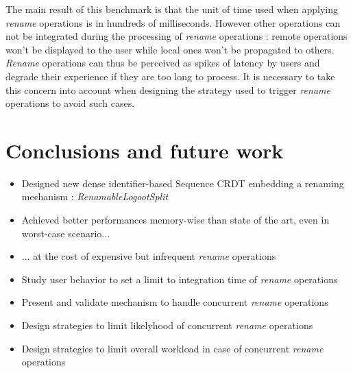\documentclass[sigplan,10pt]{acmart}
\begin{document}
The main result of this benchmark is that the unit of time used when applying \emph{rename} operations is in hundreds of milliseconds.
However other operations can not be integrated during the processing of \emph{rename} operations : remote operations won't be displayed to the user while local ones won't be propagated to others.
\emph{Rename} operations can thus be perceived as spikes of latency by users and degrade their experience if they are too long to process.
It is necessary to take this concern into account when designing the strategy used to trigger \emph{rename} operations to avoid such cases.

\section{Conclusions and future work}

\begin{itemize}
    \item Designed new dense identifier-based Sequence CRDT embedding a renaming mechanism : \emph{RenamableLogootSplit}
    \item Achieved better performances memory-wise than state of the art, even in worst-case scenario...
    \item ... at the cost of expensive but infrequent \emph{rename} operations
    \item Study user behavior to set a limit to integration time of \emph{rename} operations
    \item Present and validate mechanism to handle concurrent \emph{rename} operations
    \item Design strategies to limit likelyhood of concurrent \emph{rename} operations
    \item Design strategies to limit overall workload in case of concurrent \emph{rename} operations
\end{itemize}


\end{document}
